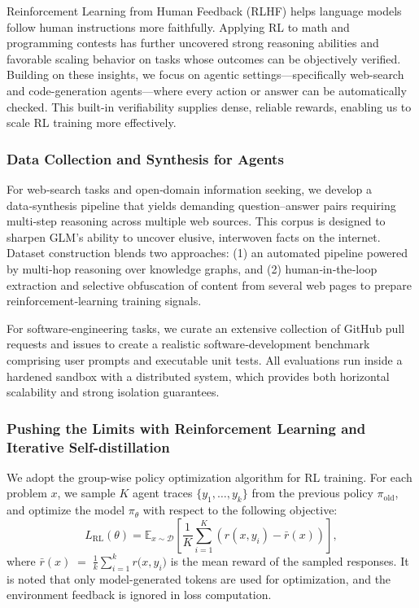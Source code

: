 \documentclass{article}
\theoremstyle{definition}
\begin{document}
Reinforcement Learning from Human Feedback (RLHF) helps language models follow human instructions more faithfully. Applying RL to math and programming contests has further uncovered strong reasoning abilities and favorable scaling behavior on tasks whose outcomes can be objectively verified. Building on these insights, we focus on agentic settings—specifically web-search and code-generation agents—where every action or answer can be automatically checked. This built-in verifiability supplies dense, reliable rewards, enabling us to scale RL training more effectively.

\subsubsection{Data Collection and Synthesis for Agents}

For web‑search tasks and open‑domain information seeking, we develop a data‑synthesis pipeline that yields demanding question–answer pairs requiring multi‑step reasoning across multiple web sources. This corpus is designed to sharpen GLM’s ability to uncover elusive, interwoven facts on the internet. Dataset construction blends two approaches: (1) an automated pipeline powered by multi‑hop reasoning over knowledge graphs, and (2) human‑in‑the‑loop extraction and selective obfuscation of content from several web pages to prepare reinforcement‑learning training signals.

For software‑engineering tasks, we curate an extensive collection of GitHub pull requests and issues to create a realistic software‑development benchmark comprising user prompts and executable unit tests. All evaluations run inside a hardened sandbox with a distributed system, which provides both horizontal scalability and strong isolation guarantees.

\subsubsection{Pushing the Limits with Reinforcement Learning and Iterative Self-distillation}

We adopt the group-wise policy optimization algorithm for RL training.
For each problem \(x\), we sample \(K\) agent traces \(\{y_1,\dots,y_k\}\) from the previous policy
\(\pi_{\text{old}}\), and optimize the model \(\pi_\theta\) with respect to the following objective:
\[
L_{\text{RL}}(\theta)
   = \mathbb{E}_{x\sim\mathcal{D}}\!\left[
        \frac{1}{K}\sum_{i=1}^{K}
        \left(
            r(x,y_i) - \bar{r}(x)
        \right)
     \right],
\]
where $\bar{r}(x) \;=\; \frac{1}{k}\sum_{i=1}^{k} r\bigl(x,y_i\bigr)$
is the mean reward of the sampled responses. It is noted that only model-generated tokens are used for optimization, and the environment feedback is ignored in loss computation. 
\end{document}
